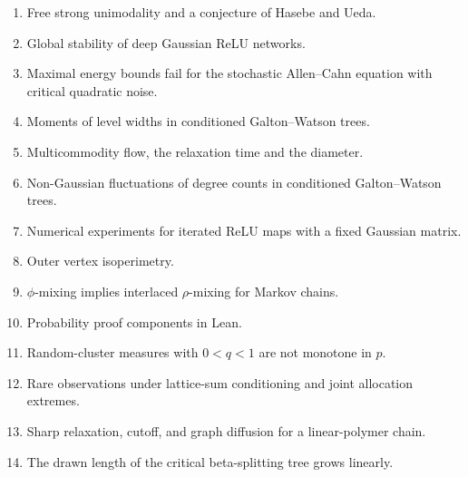 \begin{enumerate}[label=\arabic*., itemsep=3pt, leftmargin=2.2em]
\item Free strong unimodality and a conjecture of Hasebe and Ueda.\\ 
\item Global stability of deep Gaussian ReLU networks.\\ 
\item Maximal energy bounds fail for the stochastic Allen--Cahn equation with critical quadratic noise.\\ 
\item Moments of level widths in conditioned Galton--Watson trees.\\ 
\item Multicommodity flow, the relaxation time and the diameter.\\ 
\item Non-Gaussian fluctuations of degree counts in conditioned Galton--Watson trees.\\ 
\item Numerical experiments for iterated ReLU maps with a fixed Gaussian matrix.\\ 
\item Outer vertex isoperimetry.\\ 
\item $\phi$-mixing implies interlaced $\rho$-mixing for Markov chains.\\ 
\item Probability proof components in Lean.\\ 
\item Random-cluster measures with $0<q<1$ are not monotone in $p$.\\ 
\item Rare observations under lattice-sum conditioning and joint allocation extremes.\\ 
\item Sharp relaxation, cutoff, and graph diffusion for a linear-polymer chain.\\ 
\item The drawn length of the critical beta-splitting tree grows linearly.\\ 

\end{enumerate}
